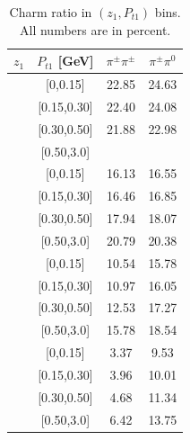 \begin{table}[H]\tiny
\centering
\begin{tabular}{|c|c|c|c|}
\hline
$z_1$ & $P_{t1}$ [GeV] &$\pi^{\pm}\pi^{\pm}$ & $\pi^{\pm}\pi^0$ \\ \hline\hline
[0.2,0.3]	&	[0,0.15]	&	22.85	&	24.63	\\ \hline
[0.2,0.3]	&	[0.15,0.30]	&	22.40	&	24.08	\\ \hline
[0.2,0.3]	&	[0.30,0.50]	&	21.88	&	22.98	\\ \hline
[0.2,0.3]	&	[0.50,3.0]	&		&		\\ \hline\hline
[0.3,0.5]	&	[0,0.15]	&	16.13	&	16.55	\\ \hline
[0.3,0.5]	&	[0.15,0.30]	&	16.46	&	16.85	\\ \hline
[0.3,0.5]	&	[0.30,0.50]	&	17.94	&	18.07	\\ \hline
[0.3,0.5]	&	[0.50,3.0]	&	20.79	&	20.38	\\ \hline\hline
[0.5,0.7]	&	[0,0.15]	&	10.54	&	15.78	\\ \hline
[0.5,0.7]	&	[0.15,0.30]	&	10.97	&	16.05	\\ \hline
[0.5,0.7]	&	[0.30,0.50]	&	12.53	&	17.27	\\ \hline
[0.5,0.7]	&	[0.50,3.0]	&	15.78	&	18.54	\\ \hline\hline
[0.7,1.0]	&	[0,0.15]	&	3.37	&	9.53	\\ \hline
[0.7,1.0]	&	[0.15,0.30]	&	3.96	&	10.01	\\ \hline
[0.7,1.0]	&	[0.30,0.50]	&	4.68	&	11.34	\\ \hline
[0.7,1.0]	&	[0.50,3.0]	&	6.42	&	13.75	\\ \hline
\end{tabular}
\caption[Charm ratio in $(z_{1},P_{t1})$ bins]{Charm ratio in $(z_{1},P_{t1})$ bins. All numbers are in percent.}
\label{tab:zptcharmratio}
\end{table}

